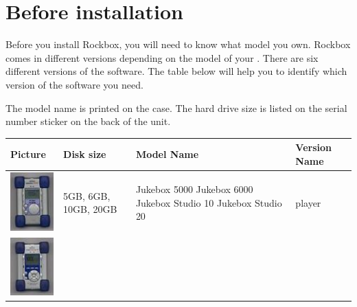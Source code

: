 \section{Before installation}

Before you install Rockbox, you will need to know what model you own.  Rockbox 
comes in different versions depending on the model of your \dap{}.  There are 
six different versions of the software.  The table below will help you to 
identify which version of the software you need.

The model name is printed on the case.  The hard drive size is listed on the
serial number sticker on the back of the unit.

\begin{center}
  \begin{tabularx}{\textwidth}{llXl}\toprule
    \label{ref:Jukeboxtypetable}
    \textbf{Picture} & \textbf{Disk size} & \textbf{Model Name} & \textbf{Version Name} \\\midrule
    \begin{minipage}{2.2cm}
      \includegraphics[width=2cm]{getting_started/images/archos-studio-small.png}
    \end{minipage} 
    & 5GB, 6GB, 10GB, 20GB & 
                             \begin{minipage}{8cm}
                             Jukebox 5000 \newline
                             Jukebox 6000 \newline
                             Jukebox Studio 10 \newline
                             Jukebox Studio 20
                             \end{minipage}
                               & player \\\midrule
    \begin{minipage}{2.2cm}
      \includegraphics[width=2cm]{getting_started/images/archos-recorder-small.png}

\end{minipage}
\end{tabularx}
\end{center}
